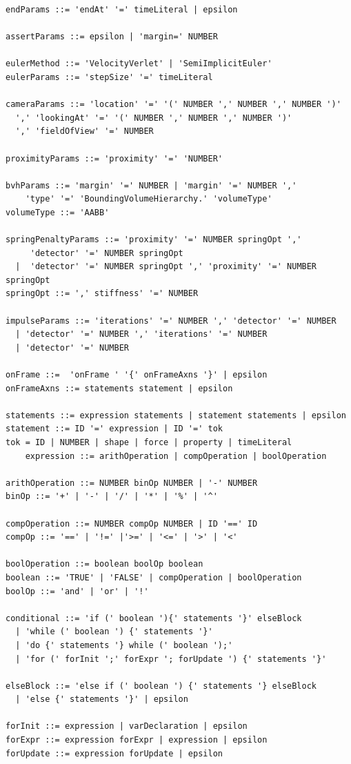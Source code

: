 \begin{verbatim}
endParams ::= 'endAt' '=' timeLiteral | epsilon 

assertParams ::= epsilon | 'margin=' NUMBER 

eulerMethod ::= 'VelocityVerlet' | 'SemiImplicitEuler'
eulerParams ::= 'stepSize' '=' timeLiteral

cameraParams ::= 'location' '=' '(' NUMBER ',' NUMBER ',' NUMBER ')'
  ',' 'lookingAt' '=' '(' NUMBER ',' NUMBER ',' NUMBER ')' 
  ',' 'fieldOfView' '=' NUMBER

proximityParams ::= 'proximity' '=' 'NUMBER'

bvhParams ::= 'margin' '=' NUMBER | 'margin' '=' NUMBER ',' 
    'type' '=' 'BoundingVolumeHierarchy.' 'volumeType'
volumeType ::= 'AABB'

springPenaltyParams ::= 'proximity' '=' NUMBER springOpt ',' 
     'detector' '=' NUMBER springOpt
  |  'detector' '=' NUMBER springOpt ',' 'proximity' '=' NUMBER springOpt
springOpt ::= ',' stiffness' '=' NUMBER 

impulseParams ::= 'iterations' '=' NUMBER ',' 'detector' '=' NUMBER 
  | 'detector' '=' NUMBER ',' 'iterations' '=' NUMBER
  | 'detector' '=' NUMBER

onFrame ::=  'onFrame ' '{' onFrameAxns '}' | epsilon
onFrameAxns ::= statements statement | epsilon

statements ::= expression statements | statement statements | epsilon
statement ::= ID '=' expression | ID '=' tok
tok = ID | NUMBER | shape | force | property | timeLiteral
	expression ::= arithOperation | compOperation | boolOperation

arithOperation ::= NUMBER binOp NUMBER | '-' NUMBER
binOp ::= '+' | '-' | '/' | '*' | '%' | '^'

compOperation ::= NUMBER compOp NUMBER | ID '==' ID
compOp ::= '==' | '!=' |'>=' | '<=' | '>' | '<'

boolOperation ::= boolean boolOp boolean
boolean ::= 'TRUE' | 'FALSE' | compOperation | boolOperation
boolOp ::= 'and' | 'or' | '!'

conditional ::= 'if (' boolean '){' statements '}' elseBlock 
  | 'while (' boolean ') {' statements '}' 
  | 'do {' statements '} while (' boolean ');' 
  | 'for (' forInit ';' forExpr '; forUpdate ') {' statements '}'

elseBlock ::= 'else if (' boolean ') {' statements '} elseBlock 
  | 'else {' statements '}' | epsilon

forInit ::= expression | varDeclaration | epsilon
forExpr ::= expression forExpr | expression | epsilon
forUpdate ::= expression forUpdate | epsilon

\end{verbatim}
